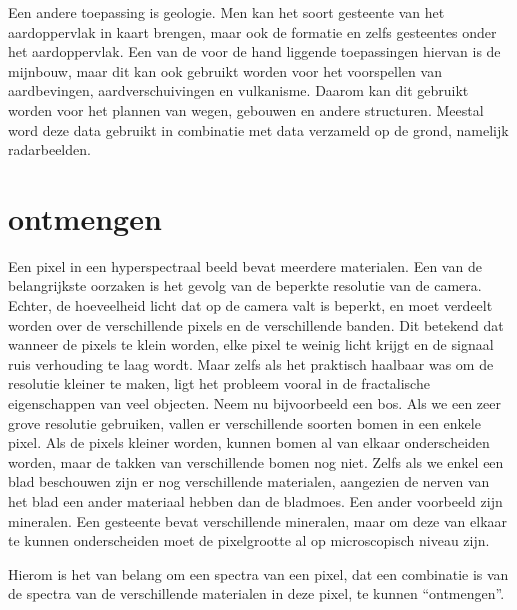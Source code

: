\documentclass[12pt]{report}
\begin{document}
Een andere toepassing is geologie. Men kan het soort gesteente van het aardoppervlak in kaart brengen, maar ook de formatie en zelfs gesteentes onder het aardoppervlak. Een van de voor de hand liggende toepassingen hiervan is de mijnbouw, maar dit kan ook gebruikt worden voor het voorspellen van aardbevingen, aardverschuivingen en vulkanisme. Daarom kan dit gebruikt worden voor het plannen van wegen, gebouwen en andere structuren. Meestal word deze data gebruikt in combinatie met data verzameld op de grond, namelijk radarbeelden. 

  


\chapter{ontmengen}





Een pixel in een hyperspectraal beeld bevat meerdere materialen. Een van de belangrijkste oorzaken is het gevolg van de beperkte resolutie van de camera. Echter, de hoeveelheid licht dat op de camera valt is beperkt, en moet verdeelt worden over de verschillende pixels en de verschillende banden. Dit betekend dat wanneer de pixels te klein worden, elke pixel te weinig licht krijgt en de signaal ruis verhouding te laag wordt. Maar zelfs als het praktisch haalbaar was om de resolutie kleiner te maken, ligt het probleem vooral in de fractalische eigenschappen van veel objecten. Neem nu bijvoorbeeld een bos. Als we een zeer grove resolutie gebruiken, vallen er verschillende soorten bomen in een enkele pixel. Als de pixels kleiner worden, kunnen bomen al van elkaar onderscheiden worden, maar de takken van verschillende bomen nog niet. Zelfs als we enkel een blad beschouwen zijn er nog verschillende materialen, aangezien de nerven van het blad een ander materiaal hebben dan de bladmoes. Een ander voorbeeld zijn mineralen. Een gesteente bevat verschillende mineralen, maar om deze van elkaar te kunnen onderscheiden moet de pixelgrootte al op microscopisch niveau zijn. 

Hierom is het van belang om een spectra van een pixel, dat een combinatie is van de spectra van de verschillende materialen in deze pixel, te kunnen ``ontmengen''.
\end{document}
